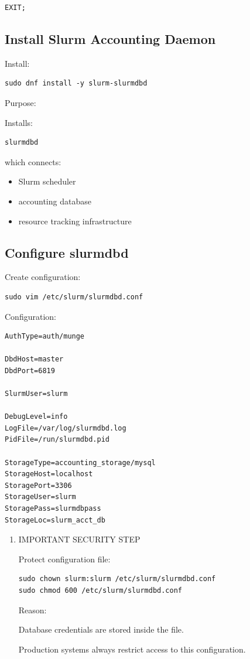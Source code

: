\documentclass[11pt]{article}
\begin{document}
\begin{verbatim}
EXIT;
\end{verbatim}
\subsection{Install Slurm Accounting Daemon}
\label{sec:org1ff5927}

Install:

\begin{verbatim}
sudo dnf install -y slurm-slurmdbd
\end{verbatim}

Purpose:

Installs:

\begin{verbatim}
slurmdbd
\end{verbatim}

which connects:

\begin{itemize}
\item Slurm scheduler
\item accounting database
\item resource tracking infrastructure
\end{itemize}
\subsection{Configure slurmdbd}
\label{sec:org08c60da}

Create configuration:

\begin{verbatim}
sudo vim /etc/slurm/slurmdbd.conf
\end{verbatim}

Configuration:

\begin{verbatim}
AuthType=auth/munge

DbdHost=master
DbdPort=6819

SlurmUser=slurm

DebugLevel=info
LogFile=/var/log/slurmdbd.log
PidFile=/run/slurmdbd.pid

StorageType=accounting_storage/mysql
StorageHost=localhost
StoragePort=3306
StorageUser=slurm
StoragePass=slurmdbpass
StorageLoc=slurm_acct_db
\end{verbatim}
\begin{enumerate}
\item IMPORTANT SECURITY STEP
\label{sec:orgf11106e}

Protect configuration file:

\begin{verbatim}
sudo chown slurm:slurm /etc/slurm/slurmdbd.conf
sudo chmod 600 /etc/slurm/slurmdbd.conf
\end{verbatim}

Reason:

Database credentials are stored inside the file.

Production systems always restrict access to this configuration.
\end{enumerate}
\end{document}
